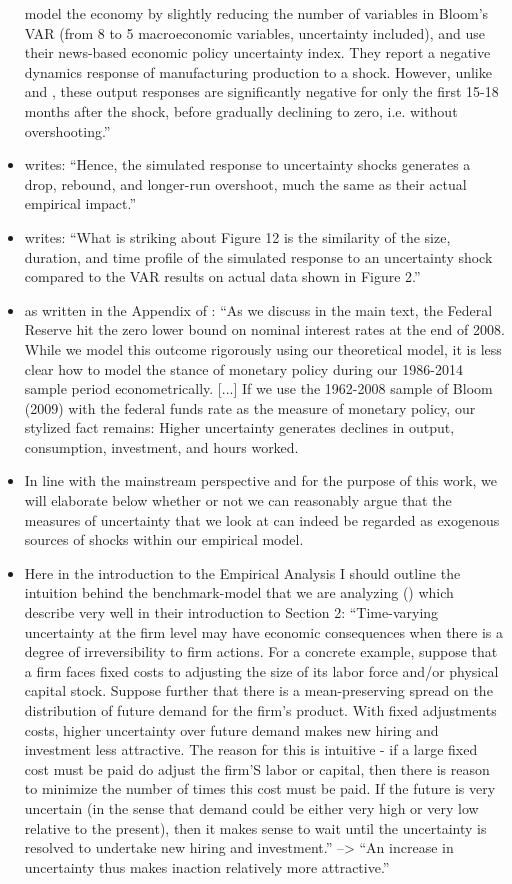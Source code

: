 \documentclass[a4paper,11pt,listof=nochaptergap,oneside,pointednumbers,bibtotoc,bigheadings,liststotoc]{scrbook}
\begin{document}
\begin{itemize}
	\citet{bakeretal:15} model the economy by slightly reducing the number of variables in Bloom's VAR (from 8 to 5 macroeconomic variables, uncertainty included), and use their news-based economic policy uncertainty index. They report a negative dynamics response of manufacturing production to a shock. However, unlike \citet{juradoetal:15} and \citet{bachmannetal:13}, these output responses are significantly negative for only the first 15-18 months after the shock, before gradually declining to zero, i.e. without overshooting.''
	\item \citet[p. 674]{bloom:09} writes: ``Hence, the simulated response to uncertainty shocks generates a drop, rebound, and longer-run overshoot, much the same as their actual empirical impact.''
	\item \citet[p. 651]{bloom:09} writes: ``What is striking about Figure 12 is the similarity of the size, duration, and time profile of the simulated response to an uncertainty shock compared to the VAR results on actual data shown in Figure 2.''
 	\item as written in the Appendix of \citet[p. 5]{basuandbundick:17}: ``As we discuss in the main text, the Federal Reserve hit the zero lower bound on nominal interest rates at the end of 2008. While we model this outcome rigorously using our theoretical model, it is less clear how to model the stance of monetary policy during our 1986-2014 sample period econometrically. [...] If we use the 1962-2008 sample of Bloom (2009) with the federal funds rate as the measure of monetary policy, our stylized fact remains: Higher uncertainty generates declines in output, consumption, investment, and hours worked.
	\item  In line with the mainstream perspective and for the purpose of this work, we will elaborate below whether or not we can reasonably argue that the measures of uncertainty that we look at can indeed be regarded as exogenous sources of shocks within our empirical model. 
	\item Here in the introduction to the Empirical Analysis I should outline the intuition behind the benchmark-model that we are analyzing (\citet{bloom:09}) which \citet{bachmannetal:13} describe very well in their introduction to Section 2: ``Time-varying uncertainty at the firm level may have economic consequences when there is a degree of irreversibility to firm actions. For a concrete example, suppose that a firm faces fixed costs to adjusting the size of its labor force and/or physical capital stock. Suppose further that there is a mean-preserving spread on the distribution of future demand for the firm's product. With fixed adjustments costs, higher uncertainty over future demand makes new hiring and investment less attractive. The reason for this is intuitive - if a large fixed cost must be paid do adjust the firm'S labor or capital, then there is reason to minimize the number of times this cost must be paid. If the future is very uncertain (in the sense that demand could be either very high or very low relative to the present), then it makes sense to wait until the uncertainty is resolved to undertake new hiring and investment.'' --> ``An increase in uncertainty thus makes inaction relatively more attractive.'' 
\end{itemize}
\end{document}
